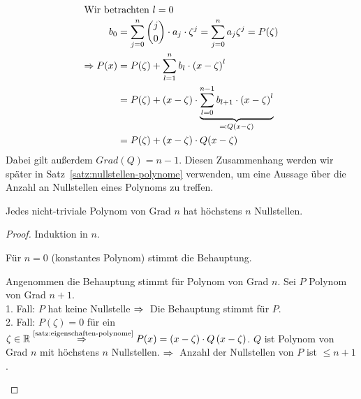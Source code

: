 \begin{satz}
\begin{enumerate}[label=(\roman*)]
\begin{align*}
            \intertext{Wir betrachten $l=0$}
            b_0 &= \sum_{j=0}^{n} \binom{j}{0}\cdot a_j\cdot\zeta^{j} = \sum_{j=0}^{n} a_j \zeta^j = P(\zeta)\\
            \Rightarrow{} P(x) &= P(\zeta) + \sum_{l=1}^{n} b_l \cdot\left(x-\zeta\right)^l\\
            &= P(\zeta) + (x-\zeta) \cdot \underbrace{\sum_{l=0}^{n-1} b_{l+1} \cdot \left(x-\zeta\right)^l}_{\eqqcolon Q(x-\zeta)}\\
            &= P(\zeta) + (x-\zeta)\cdot Q(x-\zeta)
        \end{align*}
        Dabei gilt außerdem $Grad(Q) = n-1$. Diesen Zusammenhang werden wir später in Satz~\ref{satz:nullstellen-polynome} verwenden, um eine Aussage über die Anzahl an Nullstellen eines Polynoms zu treffen.
    \end{enumerate}
\end{satz}


\begin{satz}
    \marginnote{[9. Jan]}
    \label{satz:nullstellen-polynome}
    Jedes nicht-triviale Polynom von Grad $n$ hat höchstens $n$ Nullstellen.

    \begin{proof}
        Induktion in $n$.~\\
        \begin{induktionsanfang}
            Für $n=0$ (konstantes Polynom) stimmt die Behauptung.
        \end{induktionsanfang}
        \begin{induktionsschritt}
            Angenommen die Behauptung stimmt für Polynom von Grad $n$. Sei $P$ Polynom von Grad $n+1$.\\
            1. Fall: $P$ hat keine Nullstelle $\Rightarrow{}$ Die Behauptung stimmt für $P$.\\
            2. Fall: $P(\zeta) = 0$ für ein $\zeta\in\mathbb{R} \overset{\text{\ref{satz:eigenschaften-polynome}}}{\Rightarrow{}} P(x) = (x-\zeta)\cdot Q\left(x-\zeta\right)$. $Q$ ist Polynom von Grad $n$ mit höchstens $n$ Nullstellen. $\Rightarrow{}$ Anzahl der Nullstellen von $P$ ist $\leq n+1$.\qedhere
        \end{induktionsschritt}
    \end{proof}
\end{satz}

